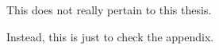\begin{appendices}
This does not really pertain to this thesis.
\end{appendices}

\begin{appendices}
Instead, this is just to check the appendix.
\end{appendices}
